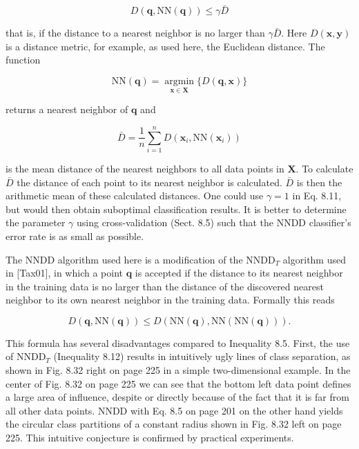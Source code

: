 \documentclass[10pt]{article}
\begin{document}
\begin{equation*}
D(\boldsymbol{q}, \mathrm{NN}(\boldsymbol{q})) \leq \gamma \bar{D} \tag{8.11}
\end{equation*}


that is, if the distance to a nearest neighbor is no larger than $\gamma \bar{D}$. Here $D(\boldsymbol{x}, \boldsymbol{y})$ is a distance metric, for example, as used here, the Euclidean distance. The function

$$
\mathrm{NN}(\boldsymbol{q})=\underset{\boldsymbol{x} \in \boldsymbol{X}}{\operatorname{argmin}}\{D(\boldsymbol{q}, \boldsymbol{x})\}
$$

returns a nearest neighbor of $\boldsymbol{q}$ and

$$
\bar{D}=\frac{1}{n} \sum_{i=1}^{n} D\left(\boldsymbol{x}_{i}, \mathrm{NN}\left(\boldsymbol{x}_{i}\right)\right)
$$

is the mean distance of the nearest neighbors to all data points in $\boldsymbol{X}$. To calculate $\bar{D}$ the distance of each point to its nearest neighbor is calculated. $\bar{D}$ is then the arithmetic mean of these calculated distances. One could use $\gamma=1$ in Eq. 8.11, but would then obtain suboptimal classification results. It is better to determine the parameter $\gamma$ using cross-validation (Sect. 8.5) such that the NNDD classifier's error rate is as small as possible.

The NNDD algorithm used here is a modification of the $\mathrm{NNDD}_{T}$ algorithm used in [Tax01], in which a point $\boldsymbol{q}$ is accepted if the distance to its nearest neighbor in the training data is no larger than the distance of the discovered nearest neighbor to its own nearest neighbor in the training data. Formally this reads


\begin{equation*}
D(\boldsymbol{q}, \mathrm{NN}(\boldsymbol{q})) \leq D(\mathrm{NN}(\boldsymbol{q}), \mathrm{NN}(\mathrm{NN}(\boldsymbol{q}))) . \tag{8.12}
\end{equation*}


This formula has several disadvantages compared to Inequality 8.5. First, the use of $\mathrm{NNDD}_{T}$ (Inequality 8.12) results in intuitively ugly lines of class separation, as shown in Fig. 8.32 right on page 225 in a simple two-dimensional example. In the center of Fig. 8.32 on page 225 we can see that the bottom left data point defines a large area of influence, despite or directly because of the fact that it is far from all other data points. NNDD with Eq. 8.5 on page 201 on the other hand yields the circular class partitions of a constant radius shown in Fig. 8.32 left on page 225. This intuitive conjecture is confirmed by practical experiments.
\end{document}
